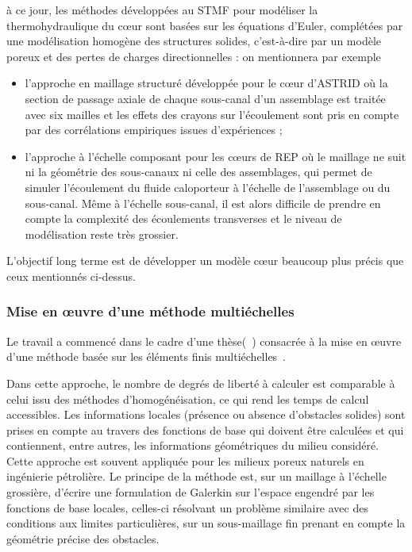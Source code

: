 \`a ce jour, les m\'ethodes d\'evelopp\'ees  au STMF pour mod\'eliser la thermohydraulique du c{\oe}ur sont bas\'ees sur les \'equations d'Euler, compl\'et\'ees par une mod\'elisation homog\`ene des structures solides, c'est-\`a-dire par un mod\`ele poreux et des pertes de charges directionnelles : on mentionnera par exemple 

\begin{itemize}
\item
l'approche en maillage structur\'e d\'evelopp\'ee pour le c{\oe}ur d'ASTRID o\`u la section de passage axiale de chaque sous-canal d'un assemblage est trait\'ee avec six mailles et les effets des crayons sur l'\'ecoulement sont pris en compte par des corr\'elations empiriques issues d'exp\'eriences ;
\item
l'approche \`a l'\'echelle composant pour les c{\oe}urs de REP o\`u le maillage ne suit  ni la g\'eom\'etrie des sous-canaux ni celle des assemblages, qui permet de simuler l'\'ecoulement du fluide caloporteur \`a l'\'echelle de l'assemblage ou du sous-canal. M\^eme \`a l'\'echelle sous-canal, il est alors difficile de prendre en compte la complexit\'e des \'ecoulements transverses et le niveau de mod\'elisation reste tr\`es grossier.
\end{itemize}

L'objectif long terme est de d\'evelopper un mod\`ele c{\oe}ur beaucoup plus pr\'ecis que ceux mentionn\'es ci-dessus.

\subsubsection{Mise en {\oe}uvre d'une m\'ethode multi\'echelles}

Le travail a commenc\'e dans le cadre d'une th\`ese(~\cite{Feng2019}) consacr\'ee \`a la mise en {\oe}uvre d'une m\'ethode bas\'ee sur les \'el\'ements finis multi\'echelles~\cite{Allaire, Efendiev, Hou}. 

Dans cette approche, le nombre de degr\'es de libert\'e \`a calculer est comparable \`a celui issu des m\'ethodes d'homog\'en\'eisation, ce qui rend  les temps de calcul accessibles. Les informations locales (pr\'esence ou absence d'obstacles solides) sont prises en compte au travers des fonctions de base qui doivent \^etre calcul\'ees et qui contiennent, entre autres, les informations g\'eom\'etriques du milieu consid\'er\'e. Cette approche est
souvent appliqu\'ee pour les milieux poreux naturels en ing\'enierie p\'etroli\`ere. Le principe de la m\'ethode est, sur un maillage \`a l'\'echelle grossi\`ere, d'\'ecrire une formulation de Galerkin sur l'espace engendr\'e par les fonctions de base locales, celles-ci r\'esolvant un probl\`eme similaire avec des conditions aux limites particuli\`eres, sur un sous-maillage fin prenant en compte la g\'eom\'etrie pr\'ecise des obstacles.

